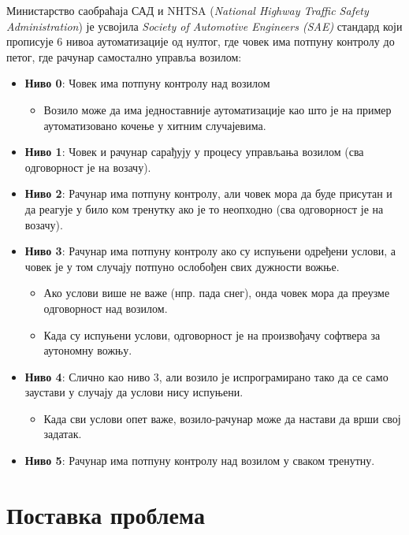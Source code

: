 \documentclass[11pt,oneside]{memoir}
\begin{document}
Министарство саобраћаја САД и NHTSA (\textit{National Highway Traffic Safety Administration}) је усвојила \textit{Society of Automotive Engineers (SAE)}
стандард који прописује 6 нивоа аутоматизације од нултог, где човек има потпуну контролу до петог, где рачунар самостално управља возилом:\cite{ad_survey}
\begin{itemize}
  \item \textbf{Ниво 0}: Човек има потпуну контролу над возилом
    \begin{itemize}
      \item Возило може да има једноставније аутоматизације као што је на пример аутоматизовано кочење у хитним случајевима.
    \end{itemize}
  \item \textbf{Ниво 1}: Човек и рачунар сарађују у процесу управљања возилом (сва одговорност је на возачу).
  \item \textbf{Ниво 2}: Рачунар има потпуну контролу, али човек мора да буде присутан и да реагује у било ком тренутку ако је то неопходно (сва одговорност је на возачу).
  \item \textbf{Ниво 3}: Рачунар има потпуну контролу ако су испуњени одређени услови, а човек је у том случају потпуно ослобођен свих дужности вожње. 
    \begin{itemize}
      \item Ако услови више не важе (нпр. пада снег), онда човек мора да преузме одговорност над возилом.
      \item Када су испуњени услови, одговорност је на произвођачу софтвера за аутономну вожњу.
    \end{itemize}
  \item  \textbf{Ниво 4}: Слично као ниво 3, али возило је испрограмирано тако да се само заустави у случају да услови нису испуњени.
    \begin{itemize}
      \item Када сви услови опет важе, возило-рачунар може да настави да врши свој задатак.
    \end{itemize}
  \item  \textbf{Ниво 5}: Рачунар има потпуну контролу над возилом у сваком тренутну.
\end{itemize}

\section{Поставка проблема}
\end{document}
